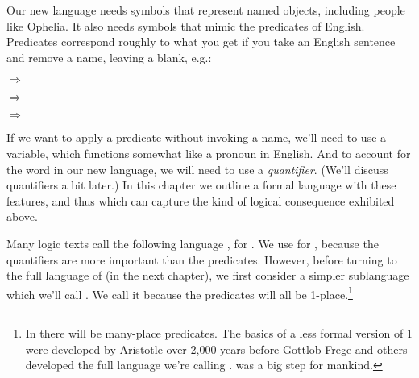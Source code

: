 Our new language needs symbols that represent named objects, including people like Ophelia.  It also needs symbols that mimic the predicates of English.  Predicates correspond roughly to what you get if you take an English sentence and remove a name, leaving a blank, e.g.: 

\begin{menumerate}
	\item {} $\Rightarrow$ 
	\item {} $\Rightarrow$ 
	\item {} $\Rightarrow$ 	
\end{menumerate}

\noindent{}If we want to apply a predicate without invoking a name, we'll need to use a variable, which functions somewhat like a pronoun in English.  And to account for the word  in our new language, we will need to use a \emph{quantifier}.  (We'll discuss quantifiers a bit later.)  In this chapter we outline a formal language with these features, and thus which can capture the kind of logical consequence exhibited above.

Many logic texts call the following language \PL{}, for . 
We use \mention{\QL{}} for , because the quantifiers are more important than the predicates. However, before turning to the full language of \GQL{} (in the next chapter), we first consider a simpler sublanguage which we'll call .  We call it  because the predicates will all be 1-place.\footnote{In \GQL{} there will be many-place predicates.  The basics of a less formal version of \GQL{}1 were developed by Aristotle over 2,000 years before Gottlob Frege and others developed the full language we're calling \GQL{}.  \GQL{} was a big step for mankind.}
 
